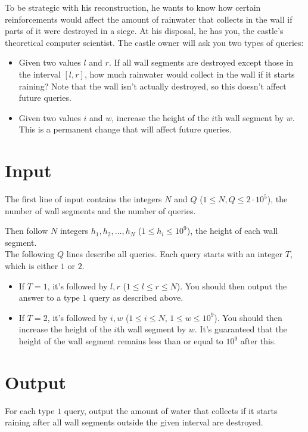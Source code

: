 To be strategic with his reconstruction, he wants to know how certain reinforcements would affect 
the amount of rainwater that collects in the wall if parts of it were destroyed in a siege. 
At his disposal, he has you, the castle's theoretical computer scientist.
The castle owner will ask you two types of queries:
\begin{itemize}
  \item Given two values $l$ and $r$. If all wall segments are destroyed except those in the interval $[l,r]$, 
  how much rainwater would collect in the wall if it starts raining?
  Note that the wall isn't actually destroyed, so this doesn't affect future queries.
  \item Given two values $i$ and $w$, increase the height of the $i$th wall segment by $w$. 
  This is a permanent change that will affect future queries.
\end{itemize}

\section*{Input}
The first line of input contains the integers $N$ and $Q$ ($1 \le N, Q \le 2 \cdot 10^5$),
the number of wall segments and the number of queries.

Then follow $N$ integers $h_1, h_2, \dots, h_N$ ($1 \leq h_i \leq 10^9$), the height of each wall segment.\\

The following $Q$ lines describe all queries. Each query starts with an integer $T$, which is either $1$ or $2$.
\begin{itemize}
  \item If $T=1$, it's followed by $l, r$ ($1 \leq l \leq r \leq N$). You should then output the answer to a type $1$ query as described above.
  \item If $T=2$, it's followed by $i, w$ ($1 \leq i \leq N$, $1 \leq w \leq 10^9$). You should then increase the height of the $i$th wall segment by $w$.
  It's guaranteed that the height of the wall segment remains less than or equal to $10^9$ after this.
\end{itemize}

\section*{Output}
For each type $1$ query, output the amount of water that collects if it starts raining after all wall segments outside
the given interval are destroyed.

